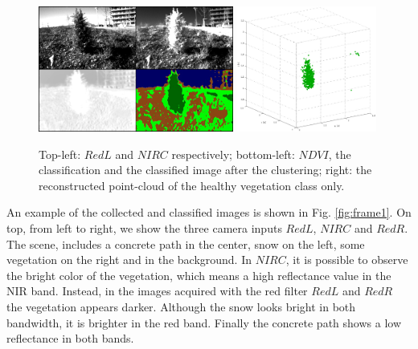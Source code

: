 \documentclass[letterpaper, 10pt, conference]{ieeeconf}      %
\begin{document}
\begin{figure}[t!]
      \centering
      \includegraphics[width=0.57\textwidth]{../images/frame_2.jpg}
      \includegraphics[width=0.41\textwidth]{../images/frame_2pc.jpg}\vspace{-1mm}
      \caption{Top-left: $RedL$ and $NIRC$ respectively; bottom-left: $NDVI$, the classification and the classified image after the clustering; right: the reconstructed point-cloud of the healthy vegetation class only.}
       \label{fig:frame2}
            \vspace{-4mm}
\end{figure}

An example of the collected and classified images is shown in Fig. \ref{fig:frame1}.
On top, from left to right, we show the three camera inputs $RedL$, $NIRC$ and $RedR$.
The scene, includes a concrete path in the center, snow on the left, some vegetation on the right and in the background.
In $NIRC$, it is possible to observe the bright color of the vegetation, which means a high reflectance value in the NIR band.
Instead,  in the images acquired with the red filter $RedL$ and $RedR$ the vegetation appears darker.
Although the snow looks bright in both bandwidth, it is brighter in the red band.
Finally the concrete path shows a low reflectance in both bands.
\end{document}
